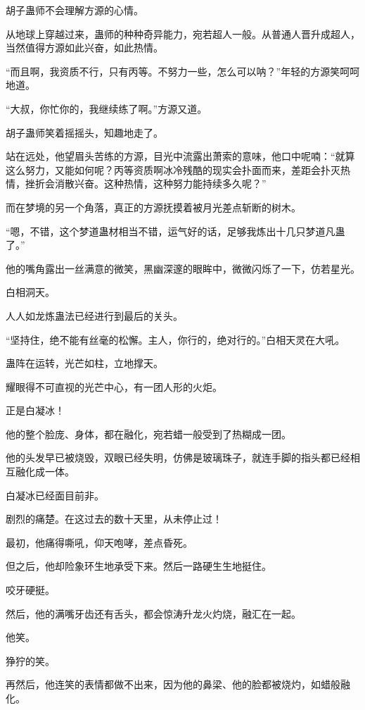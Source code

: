 
\begin{this_body}

胡子蛊师不会理解方源的心情。

从地球上穿越过来，蛊师的种种奇异能力，宛若超人一般。从普通人晋升成超人，当然值得方源如此兴奋，如此热情。

“而且啊，我资质不行，只有丙等。不努力一些，怎么可以呐？”年轻的方源笑呵呵地道。

“大叔，你忙你的，我继续练了啊。”方源又道。

胡子蛊师笑着摇摇头，知趣地走了。

站在远处，他望眉头苦练的方源，目光中流露出萧索的意味，他口中呢喃：“就算这么努力，又能如何呢？丙等资质啊冰冷残酷的现实会扑面而来，差距会扑灭热情，挫折会消散兴奋。这种热情，这种努力能持续多久呢？”

而在梦境的另一个角落，真正的方源抚摸着被月光差点斩断的树木。

“嗯，不错，这个梦道蛊材相当不错，运气好的话，足够我炼出十几只梦道凡蛊了。”

他的嘴角露出一丝满意的微笑，黑幽深邃的眼眸中，微微闪烁了一下，仿若星光。

白相洞天。

人人如龙炼蛊法已经进行到最后的关头。

“坚持住，绝不能有丝毫的松懈。主人，你行的，绝对行的。”白相天灵在大吼。

蛊阵在运转，光芒如柱，立地撑天。

耀眼得不可直视的光芒中心，有一团人形的火炬。

正是白凝冰！

他的整个脸庞、身体，都在融化，宛若蜡一般受到了热糊成一团。

他的头发早已被烧毁，双眼已经失明，仿佛是玻璃珠子，就连手脚的指头都已经相互融化成一体。

白凝冰已经面目前非。

剧烈的痛楚。在这过去的数十天里，从未停止过！

最初，他痛得嘶吼，仰天咆哮，差点昏死。

但之后，他却险象环生地承受下来。然后一路硬生生地挺住。

咬牙硬挺。

然后，他的满嘴牙齿还有舌头，都会惊涛升龙火灼烧，融汇在一起。

他笑。

狰狞的笑。

再然后，他连笑的表情都做不出来，因为他的鼻梁、他的脸都被烧灼，如蜡般融化。


\end{this_body}
